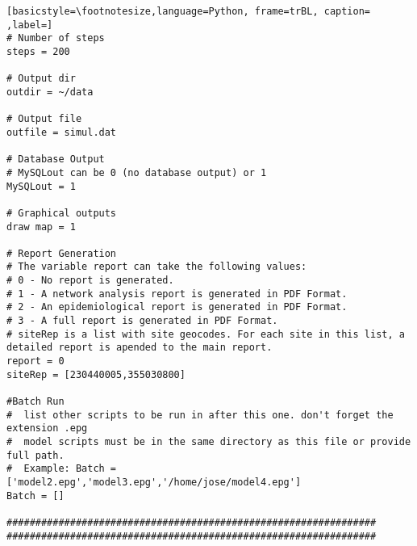 \begin{lstlisting}[basicstyle=\footnotesize,language=Python, frame=trBL, caption= ,label=]
# Number of steps
steps = 200

# Output dir
outdir = ~/data

# Output file
outfile = simul.dat

# Database Output
# MySQLout can be 0 (no database output) or 1
MySQLout = 1 

# Graphical outputs
draw map = 1

# Report Generation
# The variable report can take the following values:
# 0 - No report is generated.
# 1 - A network analysis report is generated in PDF Format.
# 2 - An epidemiological report is generated in PDF Format.
# 3 - A full report is generated in PDF Format.
# siteRep is a list with site geocodes. For each site in this list, a detailed report is apended to the main report.
report = 0
siteRep = [230440005,355030800]

#Batch Run
#  list other scripts to be run in after this one. don't forget the extension .epg
#  model scripts must be in the same directory as this file or provide full path.
#  Example: Batch = ['model2.epg','model3.epg','/home/jose/model4.epg']
Batch = []

################################################################
################################################################



\end{lstlisting}